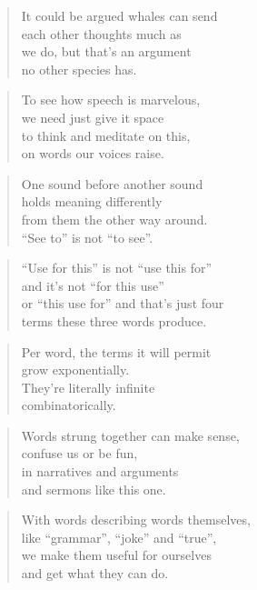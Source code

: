\documentclass[10pt,a4paper]{article}
\begin{document}
\begin{multicols}{2}
\begin{verse}
It could be argued whales can send\\
each other thoughts much as\\
we do, but that’s an argument\\
no other species has.
\end{verse}

\begin{verse}
To see how speech is marvelous,\\
we need just give it space\\
to think and meditate on this,\\
on words our voices raise.
\end{verse}

\begin{verse}
One sound before another sound\\
holds meaning differently\\
from them the other way around.\\
“See to” is not “to see”.
\end{verse}

\begin{verse}
“Use for this” is not “use this for”\\
and it’s not “for this use”\\
or “this use for” and that’s just four\\
terms these three words produce.
\end{verse}

\begin{verse}
Per word, the terms it will permit\\
grow exponentially.\\
They’re literally infinite\\
combinatorically.
\end{verse}

\begin{verse}
Words strung together can make sense,\\
confuse us or be fun,\\
in narratives and arguments\\
and sermons like this one.
\end{verse}

\begin{verse}
With words describing words themselves,\\
like “grammar”, “joke” and “true”,\\
we make them useful for ourselves\\
and get what they can do.
\end{verse}


\end{multicols}
\end{document}
